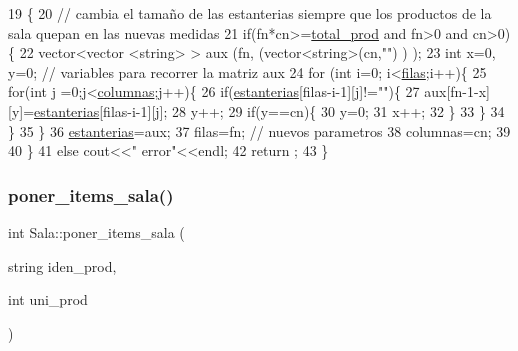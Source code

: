 \begin{DoxyCode}
19 \{
20     \textcolor{comment}{// cambia el tamaño de las estanterias siempre que los productos de la sala quepan en las nuevas
       medidas}
21     \textcolor{keywordflow}{if}(fn*cn>=\hyperlink{class_sala_aeb64df257f47ad63fe1ba3b163255e14}{total\_prod} and fn>0 and cn>0)\{
22         vector<vector <string> > aux (fn, (vector<string>(cn,\textcolor{stringliteral}{""}) ) );
23         \textcolor{keywordtype}{int} x=0, y=0; \textcolor{comment}{// variables para recorrer la matriz aux}
24         \textcolor{keywordflow}{for} (\textcolor{keywordtype}{int} i=0; i<\hyperlink{class_sala_a4cccb03763eea3ebd6d192491b25f7dc}{filas};i++)\{
25             \textcolor{keywordflow}{for}(\textcolor{keywordtype}{int} j =0;j<\hyperlink{class_sala_af3c278931f26e28e77fa363e9be82000}{columnas};j++)\{
26                 \textcolor{keywordflow}{if}(\hyperlink{class_sala_a88aae17b7e590770fe8115b41da2e26a}{estanterias}[filas-i-1][j]!=\textcolor{stringliteral}{""})\{
27                     aux[fn-1-x][y]=\hyperlink{class_sala_a88aae17b7e590770fe8115b41da2e26a}{estanterias}[filas-i-1][j];
28                     y++;
29                     \textcolor{keywordflow}{if}(y==cn)\{
30                         y=0;
31                         x++;
32                     \}
33                 \}
34             \}
35         \}
36         \hyperlink{class_sala_a88aae17b7e590770fe8115b41da2e26a}{estanterias}=aux;
37         filas=fn;           \textcolor{comment}{// nuevos parametros}
38         columnas=cn;
39         
40     \}
41     \textcolor{keywordflow}{else} cout<<\textcolor{stringliteral}{"  error"}<<endl;
42   return ;
43 \}
\end{DoxyCode}
\mbox{\label{class_sala_a378d6236451ef046231ab85c03de309f}} 
\subsubsection{\texorpdfstring{poner\+\_\+items\+\_\+sala()}{poner\_items\_sala()}}
{\footnotesize\ttfamily int Sala\+::poner\+\_\+items\+\_\+sala (\begin{DoxyParamCaption}\item[{string}]{iden\+\_\+prod,  }\item[{int}]{uni\+\_\+prod }\end{DoxyParamCaption})}



